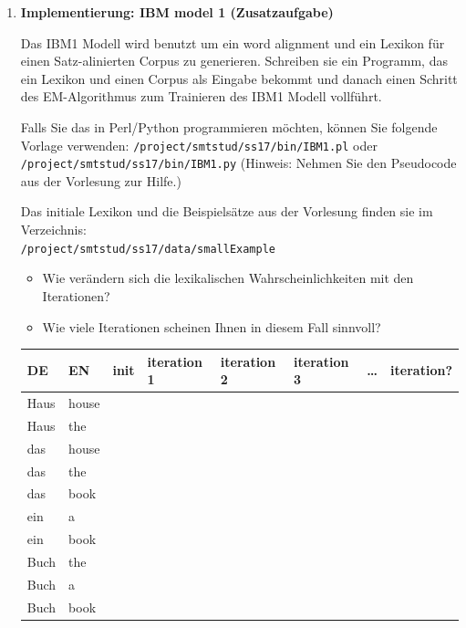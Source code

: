 \documentclass[12pt,fleqn]{article}
\begin{document}
\begin{enumerate}
\begin{enumerate}
 
\end{enumerate} 

\vspace{0.5cm} 
\item \textbf{Implementierung: IBM model 1 (Zusatzaufgabe)} 

\vspace{0.5cm} 
Das IBM1 Modell wird benutzt um ein word alignment und ein Lexikon für einen Satz-alinierten Corpus zu generieren. 
Schreiben sie ein Programm, das ein Lexikon und einen Corpus als Eingabe bekommt und danach einen Schritt des EM-Algorithmus zum Trainieren des IBM1 Modell vollführt.

\vspace{0.5cm} 
Falls Sie das in Perl/Python programmieren möchten, können Sie folgende Vorlage verwenden:
\texttt{/project/smtstud/ss17/bin/IBM1.pl} oder \texttt{/project/smtstud/ss17/bin/IBM1.py}
(Hinweis: Nehmen Sie den Pseudocode aus der Vorlesung zur Hilfe.)

\vspace{0.5cm} 
Das initiale Lexikon und die Beispielsätze aus der Vorlesung finden sie im Verzeichnis: \\ 
\texttt{/project/smtstud/ss17/data/smallExample} 

\vspace{0.5cm} 
\begin{itemize} 
 \item Wie verändern sich die lexikalischen Wahrscheinlichkeiten mit den Iterationen?
\item Wie viele Iterationen scheinen Ihnen in diesem Fall sinnvoll?
\end{itemize}

\vspace{0.5cm} 

\begin{table}[h] 
\begin{center} 
\begin{tabular}{|l|l|l|l|l|l|l|l|} \hline 
DE & EN & init & iteration 1 & iteration 2 & iteration 3 & \ldots & iteration? \\  \hline 
Haus & house & & & & & & \\  \hline 
Haus & the & & & & & & \\  \hline 
das & house & & & & & & \\  \hline  
das & the & & & & & & \\  \hline  
das & book & & & & & & \\  \hline  
ein & a & & & & & & \\  \hline  
ein & book & & & & & & \\  \hline  
Buch & the & & & & & & \\  \hline  
Buch & a & & & & & & \\  \hline  
Buch & book & & & & & & \\  \hline 
\end{tabular}
 \end{center}
\end{table}


\end{enumerate}

\newpage



\end{document}
